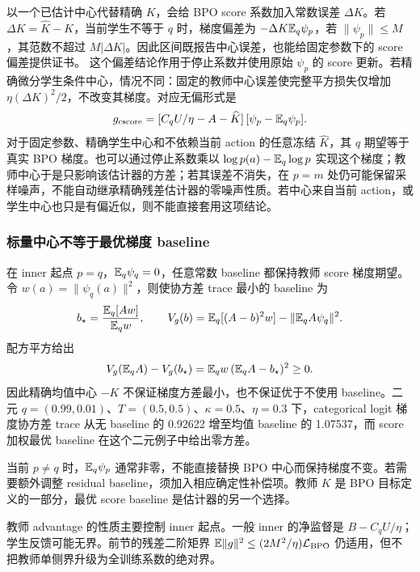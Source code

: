 以一个已估计中心代替精确 $K$，会给 BPO score 系数加入常数误差 $\Delta K$。若 $\Delta K=\widehat K-K$，当前学生不等于 $q$ 时，梯度偏差为 $-\Delta K\mathbb E_q\psi_p$，若 $\|\psi_p\|\le M$，其范数不超过 $M|\Delta K|$。因此区间既报告中心误差，也能给固定参数下的 score 偏差提供证书。 这个偏差结论作用于停止系数并使用原始 $\psi_p$ 的 score 更新。若精确微分学生条件中心，情况不同：固定的教师中心误差使完整平方损失仅增加 $\eta(\Delta K)^2/2$，不改变其梯度。对应无偏形式是
\begin{equation}
 g_{\mathrm{cscore}}=
 [C_qU/\eta-A-\widehat K]\,[\psi_p-\mathbb E_q\psi_p].
\end{equation}
对于固定参数、精确学生中心和不依赖当前 action 的任意冻结 $\widehat K$，其 $q$ 期望等于真实 BPO 梯度。也可以通过停止系数乘以 $\log p(a)-\mathbb E_q\log p$ 实现这个梯度；教师中心于是只影响该估计器的方差；若其误差不消失，在 $p=m$ 处仍可能保留采样噪声，不能自动继承精确残差估计器的零噪声性质。若中心来自当前 action，或学生中心也只是有偏近似，则不能直接套用这项结论。


\subsubsection{标量中心不等于最优梯度 baseline}

在 inner 起点 $p=q$，$\mathbb E_q\psi_q=0$，任意常数 baseline 都保持教师 score 梯度期望。令 $w(a)=\|\psi_q(a)\|^2$，则使协方差 trace 最小的 baseline 为
\begin{equation}
 b_\star=\frac{\mathbb E_q[A w]}{\mathbb E_qw},\qquad
 V_g(b)=\mathbb E_q[(A-b)^2w]-\|\mathbb E_qA\psi_q\|^2.
\end{equation}
配方平方给出
\begin{equation}
 V_g(\mathbb E_qA)-V_g(b_\star)
 =\mathbb E_qw\,(\mathbb E_qA-b_\star)^2\ge0.
\end{equation}
因此精确均值中心 $-K$ 不保证梯度方差最小，也不保证优于不使用 baseline。二元 $q=(0.99,0.01)$、$T=(0.5,0.5)$、$\kappa=0.5$、$\eta=0.3$ 下，categorical logit 梯度协方差 trace 从无 baseline 的 0.92622 增至均值 baseline 的 1.07537，而 score 加权最优 baseline 在这个二元例子中给出零方差。

当前 $p\ne q$ 时，$\mathbb E_q\psi_p$ 通常非零，不能直接替换 BPO 中心而保持梯度不变。若需要额外调整 residual baseline，须加入相应确定性补偿项。教师 $K$ 是 BPO 目标定义的一部分，最优 score baseline 是估计器的另一个选择。

教师 advantage 的性质主要控制 inner 起点。一般 inner 的净监督是 $B-C_qU/\eta$；学生反馈可能无界。前节的残差二阶矩界 $\mathbb E\|g\|^2\le(2M^2/\eta)\mathcal L_{\mathrm{BPO}}$ 仍适用，但不把教师单侧界升级为全训练系数的绝对界。

